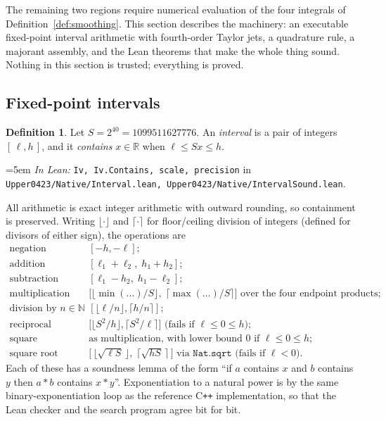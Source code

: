 \documentclass[11pt,a4paper]{article}
\theoremstyle{definition}
\newtheorem{definition}[theorem]{Definition}
\newcommand{\RR}{\mathbb{R}}
\newcommand{\NN}{\mathbb{N}}
\newcommand{\Lean}[1]{\texttt{#1}}
\newcommand{\file}[1]{\texttt{#1}}
\newcommand{\formal}[2]{%
  \par\smallskip
  \begingroup\small\raggedright\emergencystretch=5em
  \noindent\textit{In Lean:} \Lean{#1} in \file{#2}.\par
  \endgroup\smallskip}
\begin{document}
The remaining two regions require numerical evaluation of the four integrals of
Definition~\ref{def:smoothing}. This section describes the machinery: an
executable fixed-point interval arithmetic with fourth-order Taylor jets, a
quadrature rule, a majorant assembly, and the Lean theorems that make the whole
thing sound. Nothing in this section is trusted; everything is proved.

\subsection{Fixed-point intervals}

\begin{definition}
  \label{def:iv}
  Let $S=2^{40}=1099511627776$. An \emph{interval} is a pair of integers
  $[\,\ell,h\,]$, and it \emph{contains} $x\in\RR$ when
  $\ell\le Sx\le h$.
\end{definition}
\formal{Iv, Iv.Contains, scale, precision}{Upper0423/Native/Interval.lean, Upper0423/Native/IntervalSound.lean}

All arithmetic is exact integer arithmetic with outward rounding, so containment
is preserved. Writing $\lfloor\cdot\rfloor$ and $\lceil\cdot\rceil$ for
floor/ceiling division of integers (defined for divisors of either sign), the
operations are
\[
  \begin{array}{ll}
  \text{negation} & [-h,-\ell];\\
  \text{addition} & [\ell_1+\ell_2,\;h_1+h_2];\\
  \text{subtraction} & [\ell_1-h_2,\;h_1-\ell_2];\\
  \text{multiplication} & \bigl[\lfloor\min(\ldots)/S\rfloor,\;\lceil\max(\ldots)/S\rceil\bigr]
    \text{ over the four endpoint products};\\
  \text{division by } n\in\NN & [\lfloor\ell/n\rfloor,\lceil h/n\rceil];\\
  \text{reciprocal} & \bigl[\lfloor S^2/h\rfloor,\lceil S^2/\ell\rceil\bigr]
    \text{ (fails if } \ell\le0\le h);\\
  \text{square} & \text{as multiplication, with lower bound } 0 \text{ if } \ell\le0\le h;\\
  \text{square root} & \bigl[\,\lfloor\sqrt{\ell S}\,\rfloor,\;\lceil\sqrt{hS}\,\rceil\,\bigr]
    \text{ via } \Lean{Nat.sqrt} \text{ (fails if }\ell<0).
  \end{array}
\]
Each of these has a soundness lemma of the form ``if $a$ contains $x$ and $b$
contains $y$ then $a\ast b$ contains $x\ast y$''. Exponentiation to a natural
power is by the same binary-exponentiation loop as the reference C\texttt{++}
implementation, so that the Lean checker and the search program agree bit for
bit.
\end{document}
